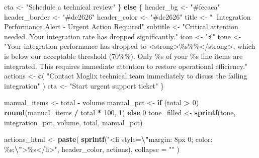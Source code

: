 \documentclass[
]{article}
\newenvironment{Shaded}{\begin{snugshade}}{\end{snugshade}}
\newcommand{\AttributeTok}[1]{\textcolor[rgb]{0.13,0.29,0.53}{#1}}
\newcommand{\ControlFlowTok}[1]{\textcolor[rgb]{0.13,0.29,0.53}{\textbf{#1}}}
\newcommand{\DecValTok}[1]{\textcolor[rgb]{0.00,0.00,0.81}{#1}}
\newcommand{\FunctionTok}[1]{\textcolor[rgb]{0.13,0.29,0.53}{\textbf{#1}}}
\newcommand{\NormalTok}[1]{#1}
\newcommand{\OtherTok}[1]{\textcolor[rgb]{0.56,0.35,0.01}{#1}}
\newcommand{\SpecialCharTok}[1]{\textcolor[rgb]{0.81,0.36,0.00}{\textbf{#1}}}
\newcommand{\StringTok}[1]{\textcolor[rgb]{0.31,0.60,0.02}{#1}}
\begin{document}
\begin{Shaded}
\begin{Highlighting}[]
\NormalTok{        cta }\OtherTok{\textless{}{-}} \StringTok{"Schedule a technical review"}
\NormalTok{      \} }\ControlFlowTok{else}\NormalTok{ \{}
\NormalTok{        header\_bg }\OtherTok{\textless{}{-}} \StringTok{"\#fecaca"}
\NormalTok{        header\_border }\OtherTok{\textless{}{-}} \StringTok{"\#dc2626"}
\NormalTok{        header\_color }\OtherTok{\textless{}{-}} \StringTok{"\#dc2626"}
\NormalTok{        title }\OtherTok{\textless{}{-}} \StringTok{"🚨 Integration Performance Alert {-} Urgent Action Required"}
\NormalTok{        subtitle }\OtherTok{\textless{}{-}} \StringTok{"Critical attention needed. Your integration rate has dropped significantly."}
\NormalTok{        icon }\OtherTok{\textless{}{-}} \StringTok{"⚡"}
\NormalTok{        tone }\OtherTok{\textless{}{-}} \StringTok{"Your integration performance has dropped to \textless{}strong\textgreater{}\%s\%\%\textless{}/strong\textgreater{}, which is below our acceptable threshold (70\%\%). Only \%s of your \%s line items are integrated. This requires immediate attention to restore operational efficiency."}
\NormalTok{        actions }\OtherTok{\textless{}{-}} \FunctionTok{c}\NormalTok{(}
          \StringTok{"Contact Moglix technical team immediately to disuss the failing integration"}
\NormalTok{        )}
\NormalTok{        cta }\OtherTok{\textless{}{-}} \StringTok{"Start urgent support ticket"}
\NormalTok{      \}}
      
\NormalTok{      manual\_items }\OtherTok{\textless{}{-}}\NormalTok{ total }\SpecialCharTok{{-}}\NormalTok{ volume}
\NormalTok{      manual\_pct }\OtherTok{\textless{}{-}} \ControlFlowTok{if}\NormalTok{ (total }\SpecialCharTok{\textgreater{}} \DecValTok{0}\NormalTok{) }\FunctionTok{round}\NormalTok{(manual\_items }\SpecialCharTok{/}\NormalTok{ total }\SpecialCharTok{*} \DecValTok{100}\NormalTok{, }\DecValTok{1}\NormalTok{) }\ControlFlowTok{else} \DecValTok{0}
\NormalTok{      tone\_filled }\OtherTok{\textless{}{-}} \FunctionTok{sprintf}\NormalTok{(tone, integration\_pct, volume, total, manual\_pct)}
      
\NormalTok{      actions\_html }\OtherTok{\textless{}{-}} \FunctionTok{paste}\NormalTok{(}
        \FunctionTok{sprintf}\NormalTok{(}\StringTok{"\textless{}li style=}\SpecialCharTok{\textbackslash{}"}\StringTok{margin: 8px 0; color: \%s;}\SpecialCharTok{\textbackslash{}"}\StringTok{\textgreater{}\%s\textless{}/li\textgreater{}"}\NormalTok{, header\_color, actions),}
        \AttributeTok{collapse =} \StringTok{""}
\NormalTok{      )}
      

\end{Highlighting}
\end{Shaded}
\end{document}
